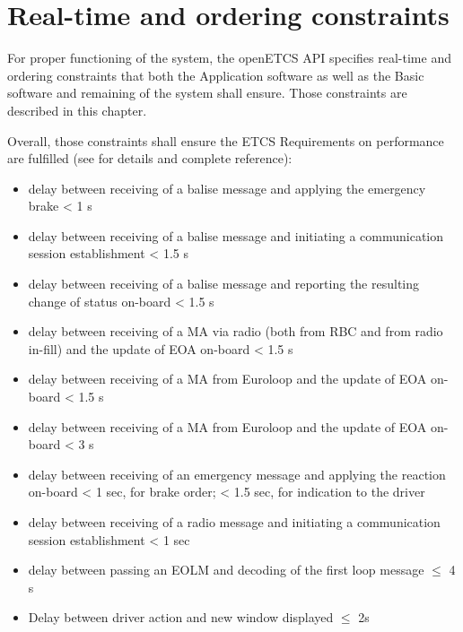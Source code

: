 \chapter{Real-time and ordering constraints}

For proper functioning of the system, the openETCS API specifies
real-time and ordering constraints that both the Application software
as well as the Basic software and remaining of the system shall
ensure. Those constraints are described in this chapter.

Overall, those constraints shall ensure the ETCS Requirements on
performance are fulfilled (see \cite{subset-041} for details and
complete reference):
\begin{itemize}
\item delay between receiving of a balise message and applying the
  emergency brake < 1 s

\item delay between receiving of a balise message and initiating a
  communication session establishment < 1.5 s

\item delay between receiving of a balise message and reporting the
  resulting change of status on-board < 1.5 s

\item delay between receiving of a MA via radio (both from RBC and
  from radio in-fill) and the update of EOA on-board < 1.5 s

\item delay between receiving of a MA from Euroloop and the update of
  EOA on-board < 1.5 s

\item delay between receiving of a MA from Euroloop and the update of
  EOA on-board < 3 s

\item delay between receiving of an emergency message and applying the
  reaction on-board < 1 sec, for brake order; < 1.5 sec, for
  indication to the driver

\item delay between receiving of a radio message and initiating a
  communication session establishment < 1 sec

\item delay between passing an EOLM and decoding of the first loop
  message $\le$ 4 s

\item Delay between driver action and new window displayed $\le$ 2s


\end{itemize}
